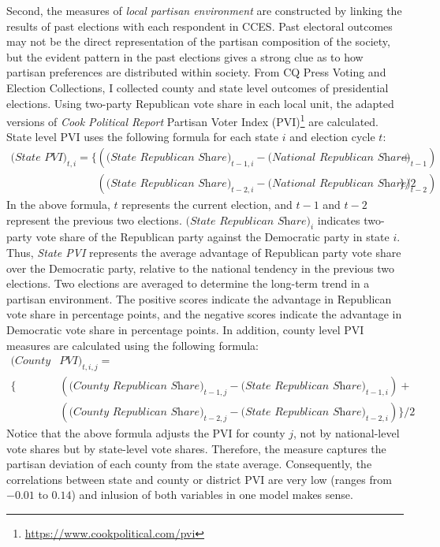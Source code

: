 \documentclass[letterpaper, 12pt]{article}
\begin{document}
    \par Second, the measures of \textit{local partisan environment} are constructed by linking the results of past elections with each respondent in CCES. Past electoral outcomes may not be the direct representation of the partisan composition of the society, but the evident pattern in the past elections gives a strong clue as to how partisan preferences are distributed within society. From CQ Press Voting and Election Collections, I collected county and state level outcomes of presidential elections. Using two-party Republican vote share in each local unit, the adapted versions of \textit{Cook Political Report} Partisan Voter Index (PVI)\footnote{\url{https://www.cookpolitical.com/pvi}} are calculated. State level PVI uses the following formula for each state $i$ and election cycle $t$: 
    \begin{align*}
    \textit{(State PVI)}_{t,i} = \{ & (\textit{(State Republican Share)}_{t-1, i} - \textit{(National Republican Share)}_{t-1}) + \\  
    &(\textit{(State Republican Share)}_{t-2, i} - \textit{(National Republican Share)}_{t-2}) \}/2
    \end{align*}    
    \noindent In the above formula, $t$ represents the current election, and $t-1$ and $t-2$ represent the previous two elections. $\textit{(State Republican Share)}_i$ indicates two-party vote share of the Republican party against the Democratic party in state $i$. Thus, \textit{State PVI} represents the average advantage of Republican party vote share over the Democratic party, relative to the national tendency in the previous two elections. Two elections are averaged to determine the long-term trend in a partisan environment. The positive scores indicate the advantage in Republican vote share in percentage points, and the negative scores indicate the advantage in Democratic vote share in percentage points. In addition, county level PVI measures are calculated using the following formula:
    \begin{align*}
        \textit{(County}& \textit{PVI)}_{t,i,j} = \\
        \{ &(\textit{(County Republican Share)}_{t-1, j} - \textit{(State Republican Share)}_{t-1,i}) + \\  
        &(\textit{(County Republican Share)}_{t-2, j} - \textit{(State Republican Share)}_{t-2, i}) \}/2
    \end{align*}    
    \noindent Notice that the above formula adjusts the PVI for county $j$, not by national-level vote shares but by state-level vote shares. Therefore, the measure captures the partisan deviation of each county from the state average. Consequently, the correlations between state and county or district PVI are very low (ranges from $-0.01$ to $0.14$) and inlusion of both variables in one model makes sense.
        
\end{document}
